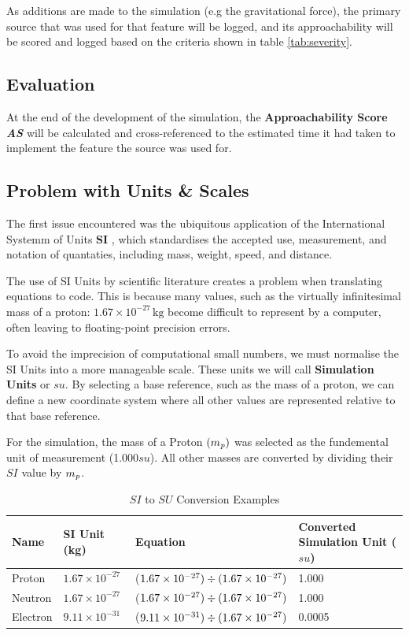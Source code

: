 As additions are made to the simulation (e.g the gravitational force), 
the primary source that was used for that feature will be logged, and its approachability will be scored and logged based on the criteria shown in table \ref{tab:severity}.

\subsection{Evaluation}
At the end of the development of the simulation, the \textbf{Approachability Score \textit{AS}} will be calculated and cross-referenced to the estimated time it had taken to implement the feature the source was used for.

\subsection{Problem with Units \& Scales}

The first issue encountered was the ubiquitous application of the International Systemm of Units \textbf{SI} \autocite{nist_si_units}, which standardises the accepted use, measurement, and notation
of quantaties, including mass, weight, speed, and distance.

The use of SI Units by scientific literature creates a problem when translating equations to code. This is because many values, such as the virtually infinitesimal mass of a proton: 
$1.67 \times 10^{-27}\,\mathrm{kg}$ become difficult to represent by a computer, often leaving to floating-point precision errors.

To avoid the imprecision of computational small numbers, we must normalise the SI Units into a more manageable scale. These units we will call \textbf{Simulation Units} or $su$. 
By selecting a base reference, such as the mass of a proton, we can define a new coordinate system where all other values 
are represented relative to that base reference.

For the simulation, the mass of a Proton $(m_{\textit{p}})$ was selected as the fundemental unit of measurement (1.000$su$). All other masses are converted by dividing their $SI$ value by $m_{\textit{p}}$.

\begin{table}[h]
\centering
\caption{$SI$ to $SU$ Conversion Examples }
\label{tab:si-to-su-conversion}
\begin{tabular}{llll}
\toprule
Name     & SI Unit (kg) & Equation & Converted Simulation Unit ($su$) \\ \midrule
Proton   & $1.67 \times 10^{-27}$ & ($1.67 \times 10^{-27}) \divisionsymbol (1.67 \times 10^{-27})$ & 1.000 \\
Neutron  & $1.67 \times 10^{-27}$ & ($1.67 \times 10^{-27}) \divisionsymbol (1.67 \times 10^{-27})$ & 1.000 \\
Electron & $9.11 \times 10^{-31}$ & ($9.11 \times 10^{-31}) \divisionsymbol (1.67 \times 10^{-27})$ & 0.0005 \\ \bottomrule
\end{tabular}
\end{table}

